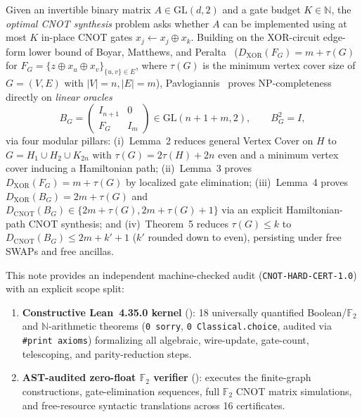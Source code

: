 \documentclass[10pt,twocolumn]{article}
\begin{document}
Given an invertible binary matrix $A \in \mathrm{GL}(d, 2)$ and a gate budget $K \in \mathbb{N}$, the \emph{optimal CNOT synthesis} problem asks whether $A$ can be implemented using at most $K$ in-place CNOT gates $x_j \leftarrow x_j \oplus x_k$. Building on the XOR-circuit edge-form lower bound of Boyar, Matthews, and Peralta~\cite{boyar2013} ($D_{\mathrm{XOR}}(F_G) = m + \tau(G)$ for $F_G = \{z \oplus x_u \oplus x_v\}_{\{u,v\} \in E}$, where $\tau(G)$ is the minimum vertex cover size of $G = (V, E)$ with $|V|=n, |E|=m$), Pavlogiannis~\cite{pavlogiannis2026cnot} proves NP-completeness directly on \emph{linear oracles}
\begin{equation}
  B_G = \begin{pmatrix} I_{n+1} & 0 \\ F_G & I_m \end{pmatrix} \in \mathrm{GL}(n+1+m, 2), \qquad B_G^2 = I,
\end{equation}
via four modular pillars: (i)~Lemma~2 reduces general Vertex Cover on $H$ to $G = H_1 \cup H_2 \cup K_{2n}$ with $\tau(G) = 2\tau(H) + 2n$ even and a minimum vertex cover inducing a Hamiltonian path; (ii)~Lemma~3 proves $D_{\mathrm{XOR}}(F_G) = m + \tau(G)$ by localized gate elimination; (iii)~Lemma~4 proves $D_{\mathrm{XOR}}(B_G) = 2m + \tau(G)$ and $D_{\mathrm{CNOT}}(B_G) \in \{2m+\tau(G), 2m+\tau(G)+1\}$ via an explicit Hamiltonian-path CNOT synthesis; and (iv)~Theorem~5 reduces $\tau(G) \le k$ to $D_{\mathrm{CNOT}}(B_G) \le 2m + k' + 1$ ($k'$ rounded down to even), persisting under free SWAPs and free ancillas.

This note provides an independent machine-checked audit (\texttt{CNOT-HARD-CERT-1.0}) with an explicit scope split:
\begin{enumerate}
  \item \textbf{Constructive Lean~4.35.0 kernel} (): 18 universally quantified Boolean/$\mathbb{F}_2$ and $\mathbb{N}$-arithmetic theorems (\texttt{0 sorry}, \texttt{0 Classical.choice}, audited via \texttt{\#print axioms}) formalizing all algebraic, wire-update, gate-count, telescoping, and parity-reduction steps.
  \item \textbf{AST-audited zero-float $\mathbb{F}_2$ verifier} (): executes the finite-graph constructions, gate-elimination sequences, full $\mathbb{F}_2$ CNOT matrix simulations, and free-resource syntactic translations across 16 certificates.
\end{enumerate}
\end{document}
